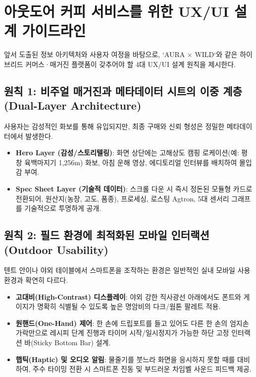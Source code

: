 \documentclass[10pt,a4paper]{article}
\begin{document}
\section{아웃도어 커피 서비스를 위한 UX/UI 설계 가이드라인}

앞서 도출된 정보 아키텍처와 사용자 여정을 바탕으로, `AURA × WILD`와 같은 하이브리드 커머스·매거진 플랫폼이 갖추어야 할 4대 UX/UI 설계 원칙을 제시한다.

\subsection{원칙 1: 비주얼 매거진과 메타데이터 시트의 이중 계층 (Dual-Layer Architecture)}
사용자는 감성적인 화보를 통해 유입되지만, 최종 구매와 신뢰 형성은 정밀한 메타데이터에서 발생한다.
\begin{itemize}[itemsep=2pt]
    \item \textbf{Hero Layer (감성/스토리텔링)}: 화면 상단에는 고해상도 캠핑 로케이션(예: 평창 육백마지기 1,256m) 화보, 아침 운해 영상, 에디토리얼 인터뷰를 배치하여 몰입감 부여.
    \item \textbf{Spec Sheet Layer (기술적 데이터)}: 스크롤 다운 시 즉시 정돈된 모듈형 카드로 전환되어, 원산지(농장, 고도, 품종), 프로세싱, 로스팅 Agtron, 5대 센서리 그래프를 기술적으로 투명하게 공개.
\end{itemize}

\subsection{원칙 2: 필드 환경에 최적화된 모바일 인터랙션 (Outdoor Usability)}
텐트 안이나 야외 테이블에서 스마트폰을 조작하는 환경은 일반적인 실내 모바일 사용 환경과 확연히 다르다.
\begin{itemize}[itemsep=2pt]
    \item \textbf{고대비(High-Contrast) 디스플레이}: 야외 강한 직사광선 아래에서도 폰트와 게이지가 명확히 식별될 수 있도록 높은 명암비의 다크/웜톤 팔레트 적용.
    \item \textbf{원핸드(One-Hand) 제어}: 한 손에 드립포트를 들고 있어도 다른 한 손의 엄지손가락만으로 레시피 단계 진행과 타이머 시작/일시정지가 가능한 하단 고정 인터랙션 바(Sticky Bottom Bar) 설계.
    \item \textbf{햅틱(Haptic) 및 오디오 알림}: 물줄기를 붓느라 화면을 응시하지 못할 때를 대비하여, 주수 타이밍 전환 시 스마트폰 진동 및 부드러운 차임벨 사운드 피드백 제공.
\end{itemize}
\end{document}
